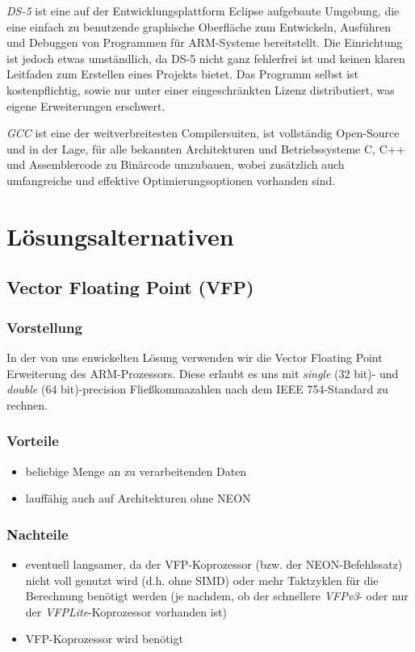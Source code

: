 \documentclass[11pt]{scrartcl}
\begin{document}
\emph{DS-5} ist eine auf der Entwicklungsplattform Eclipse aufgebaute Umgebung, die eine einfach zu benutzende graphische Oberfläche zum Entwickeln, Ausführen und Debuggen von Programmen für ARM-Systeme bereitstellt. Die Einrichtung ist jedoch etwas umständlich, da DS-5 nicht ganz fehlerfrei ist und keinen klaren Leitfaden zum Erstellen eines Projekts bietet. Das Programm selbst ist kostenpflichtig, sowie nur unter einer eingeschränkten Lizenz distributiert, was eigene Erweiterungen erschwert.

\emph{GCC} ist eine der weitverbreitesten Compilersuiten, ist vollständig Open-Source und in der Lage, für alle bekannten Architekturen und Betriebssysteme C, C++ und Assemblercode zu Binärcode umzubauen, wobei zusätzlich auch umfangreiche und effektive Optimierungsoptionen vorhanden sind.

\section{Lösungsalternativen}
\subsection{Vector Floating Point (VFP)}
\subsubsection*{Vorstellung}
In der von uns enwickelten Lösung verwenden wir die Vector Floating Point Erweiterung des ARM-Prozessors. 
Diese erlaubt es uns mit \emph{single} (32 bit)- und \emph{double} (64 bit)-precision Fließkommazahlen nach dem IEEE 754-Standard zu rechnen.
\subsubsection*{Vorteile}
\begin{itemize}
\item beliebige Menge an zu verarbeitenden Daten
\item lauffähig auch auf Architekturen ohne NEON
\end{itemize}
\subsubsection*{Nachteile}
\begin{itemize}
\item eventuell langsamer, da der VFP-Koprozessor (bzw. der NEON-Befehlssatz) nicht voll genutzt wird (d.h. ohne SIMD) oder mehr Taktzyklen für die Berechnung benötigt werden (je nachdem, ob der schnellere \emph{VFPv3}- oder nur der \emph{VFPLite}-Koprozessor vorhanden ist)
\item VFP-Koprozessor wird benötigt
\end{itemize}
\end{document}
